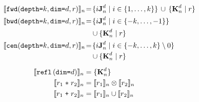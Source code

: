 \begin{align*}
%
%
\interp{\stenFwdSR{k}{d}{r}}_n \!& =\!
  \{i\singleEntry{d}{n} \mid i \in \{1, \ldots, k\} \} \, \cup \, \{
                             \zeroEntry{d}{n} \mid r \} \\
\interp{\stenBwdSR{k}{d}{r}}_n \!& =\!
  \{i\singleEntry{d}{n} \mid i \in \{-k, \ldots, -1\} \}  \\
 & \quad \cup \{  \zeroEntry{d}{n} \mid r \} \\
\interp{\stenCenSR{k}{d}{r}}_n \!& =\!
  \{i\singleEntry{d}{n} \mid i \in \{-k, \ldots, k\} \setminus 0 \}
  \\[-0.2em]
& \quad \cup  \{ \zeroEntry{d}{n} \mid r \} \\[0.5em]
\interp{\stenReflS{d}}_n & = \{ \zeroEntry{d}{n} \} \\
%
%
\interp{r_1 \; \texttt{$\ast$} \; r_2}_n &
= \interp{r_1}_n \otimes \interp{r_2}_n \\
%
%
\interp{r_1 \; \texttt{+} \; r_2}_n &
= \interp{r_1}_n \cup \interp{r_2}_n
\end{align*}
